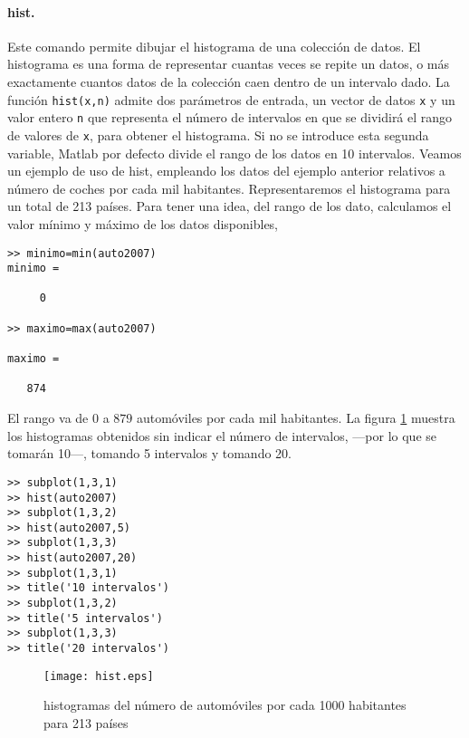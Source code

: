 \paragraph{hist.} Este comando permite dibujar el histograma de una colección de datos. El histograma es una forma de representar cuantas veces se repite un datos, o más exactamente cuantos datos de la colección caen dentro de un intervalo dado. La función \texttt{hist(x,n)} admite dos parámetros de entrada, un vector de datos \texttt{x} y un valor entero \texttt{n} que representa el número de intervalos en que se dividirá el rango de valores de \texttt{x}, para obtener el histograma. Si no se introduce esta segunda variable, Matlab por defecto divide el rango de los datos en 10 intervalos. Veamos un ejemplo de uso de hist, empleando los datos del ejemplo anterior relativos a número de coches por cada mil habitantes. Representaremos el histograma para un total de 213 países. Para tener una idea, del rango de los dato, calculamos el valor mínimo y máximo de los datos disponibles,
\begin{verbatim}
>> minimo=min(auto2007)
minimo =

     0

>> maximo=max(auto2007)

maximo =

   874
\end{verbatim}

El rango va de $0$ a $879$ automóviles por cada mil habitantes. La figura \ref{fig:hist} muestra los histogramas obtenidos sin indicar el número de intervalos, ---por lo que se tomarán 10---, tomando 5 intervalos y tomando 20.

\begin{verbatim}
>> subplot(1,3,1)
>> hist(auto2007)
>> subplot(1,3,2)
>> hist(auto2007,5)
>> subplot(1,3,3)
>> hist(auto2007,20)
>> subplot(1,3,1)
>> title('10 intervalos')
>> subplot(1,3,2)
>> title('5 intervalos')
>> subplot(1,3,3)
>> title('20 intervalos')
\end{verbatim}

\begin{figure}[h]
\centering
\texttt{[image: hist.eps]}
\caption{histogramas del número de automóviles por cada 1000 habitantes para 213 países}
\label{fig:hist}
\end{figure}

